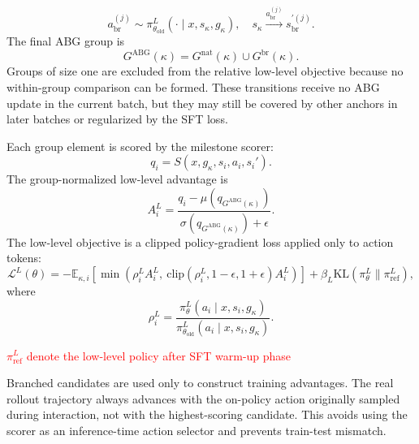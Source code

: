 \documentclass{article}
\newcommand{\wei}[1]{\textcolor{red}{#1}}
\begin{document}
%


\begin{equation}
a_{\mathrm{br}}^{(j)}
\sim
\pi_{\theta_{\mathrm{old}}}^{L}(\cdot\mid x,s_\kappa,g_\kappa),
\quad
s_\kappa \xrightarrow{a_{\mathrm{br}}^{(j)}} s_{\mathrm{br}}^{\prime(j)}.
\label{eq:branching}
\end{equation}
The final ABG group is
\begin{equation}
G^{\mathrm{ABG}}(\kappa)
=
G^{\mathrm{nat}}(\kappa)\cup G^{\mathrm{br}}(\kappa).
\label{eq:abg_group}
\end{equation}
Groups of size one are excluded from the relative low-level objective because no within-group comparison can be formed. These transitions receive no ABG update in the current batch, but they may still be covered by other anchors in later batches or regularized by the SFT loss.


Each group element is scored by the milestone scorer:
\begin{equation}
q_i = S(x,g_\kappa,s_i,a_i,s_i').
\end{equation}
The group-normalized low-level advantage is
\begin{equation}
A_i^L
=
\frac{q_i-\mu(q_{G^{\mathrm{ABG}}(\kappa)})}
{\sigma(q_{G^{\mathrm{ABG}}(\kappa)})+\epsilon}.
\label{eq:low_adv}
\end{equation}
The low-level objective is a clipped policy-gradient loss applied only to action tokens:
\begin{equation}
\mathcal{L}^L(\theta)
=
-\mathbb{E}_{\kappa,i}
\left[
\min
\left(
\rho_i^L A_i^L,\ 
\mathrm{clip}(\rho_i^L,1-\epsilon,1+\epsilon)A_i^L
\right)
\right]
+
\beta_L\mathrm{KL}(\pi_\theta^L\|\pi_{\mathrm{ref}}^L),
\label{eq:low_loss}
\end{equation}
where
\begin{equation}
\rho_i^L
=
\frac{
\pi_\theta^L(a_i\mid x,s_i,g_\kappa)
}{
\pi_{\theta_{\mathrm{old}}}^L(a_i\mid x,s_i,g_\kappa)
}.
\end{equation}

\wei{$\pi_{\mathrm{ref}}^L$ denote the low-level policy after SFT warm-up phase}

Branched candidates are used only to construct training advantages. The real rollout trajectory always advances with the on-policy action originally sampled during interaction, not with the highest-scoring candidate. This avoids using the scorer as an inference-time action selector and prevents train-test mismatch.
\end{document}
